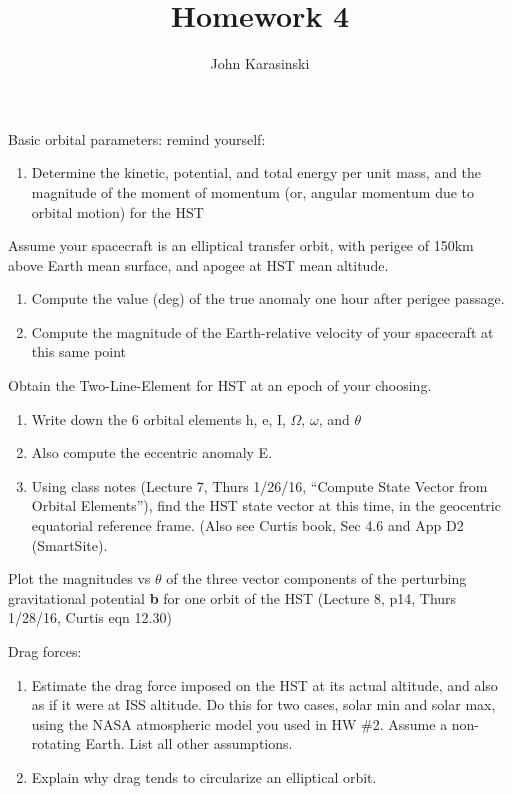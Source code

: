 \documentclass[onecolumn,10pt]{jhwhw}
\author{John Karasinski}
\title{Homework 4}
\begin{document}

\problem{}
Basic orbital parameters: remind yourself:
\begin{enumerate}
\item Determine the kinetic, potential, and total energy per unit mass, and the magnitude of the moment of
momentum (or, angular momentum due to orbital motion) for the HST
\end{enumerate}

\problem{}
Assume your spacecraft is an elliptical transfer orbit, with perigee of 150km above Earth mean surface, and apogee at HST mean altitude.
\begin{enumerate}
\item Compute the value (deg) of the true anomaly one hour after perigee passage.
\item Compute the magnitude of the Earth-relative velocity of your spacecraft at this same point
\end{enumerate}

\problem{}
Obtain the Two-Line-Element for HST at an epoch of your choosing.
\begin{enumerate}
\item Write down the 6 orbital elements h, e, I, $\Omega$, $\omega$, and $\theta$
\item Also compute the eccentric anomaly E.
\item Using class notes (Lecture 7, Thurs 1/26/16, ``Compute State Vector from Orbital Elements''), find the HST state vector at this time, in the geocentric equatorial reference frame. (Also see Curtis book, Sec 4.6 and App D2 (SmartSite).
\end{enumerate}

\problem{}
Plot the magnitudes vs $\theta$ of the three vector components of the perturbing gravitational potential \textbf{b} for one orbit of the HST (Lecture 8, p14, Thurs 1/28/16, Curtis eqn 12.30)

\problem{}
Drag forces:
\begin{enumerate}
\item Estimate the drag force imposed on the HST at its actual altitude, and also as if it were at ISS altitude. Do this for two cases, solar min and solar max, using the NASA atmospheric model you used in HW \#2. Assume a non-rotating Earth. List all other assumptions.
\item Explain why drag tends to circularize an elliptical orbit.
\end{enumerate}
\end{document}
